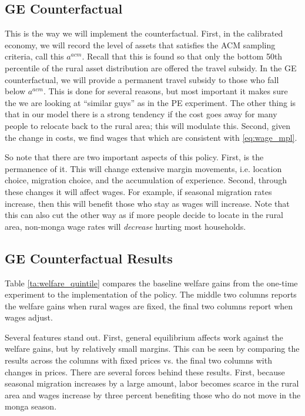 \documentclass[pdftex,11pt]{article}
\begin{document}
\subsection{GE Counterfactual}

This is the way we will implement the counterfactual. First, in the calibrated economy, we will record the level of assets that satisfies the ACM sampling criteria, call this $a^{acm}$. Recall that this is found so that only the bottom 50th percentile of the rural asset distribution are offered the travel subsidy. In the GE counterfactual, we will provide a permanent travel subsidy to those who fall below $a^{acm}$. This is done for several reasons, but most important it makes sure the we are looking at ``similar guys'' as in the PE experiment. The other thing is that in our model there is a strong tendency if the cost goes away for many people to relocate back to the rural area; this will modulate this. Second, given the change in costs, we find wages that which are consistent with \ref{eq:wage_mpl}.

So note that there are two important aspects of this policy. First, is the permanence of it. This will change extensive margin movements, i.e. location choice, migration choice, and the accumulation of experience. Second, through these changes it will affect wages. For example, if seasonal migration rates increase, then this will benefit those who stay as wages will increase. Note that this can also cut the other way as if more people decide to locate in the rural area, non-monga wage rates will \emph{decrease} hurting most households.

\subsection{GE Counterfactual Results}

Table \ref{ta:welfare_quintile} compares the baseline welfare gains from the one-time experiment to the implementation of the policy. The middle two columns reports the welfare gains when rural wages are fixed, the final two columns report when wages adjust.

Several features stand out. First, general equilibrium affects work against the welfare gains, but by relatively small margins. This can be seen by comparing the results across the columns with fixed prices vs. the final two columns with changes in prices. There are several forces behind these results. First, because seasonal migration increases by a large amount, labor becomes scarce in the rural area and wages increase by three percent benefiting those who do not move in the monga season. 
\end{document}
